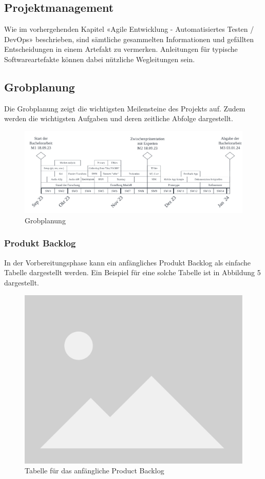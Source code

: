 \documentclass[main.tex]{subfiles} %
\begin{document}
\subsection{Projektmanagement}

Wie im vorhergehenden Kapitel «Agile Entwicklung - Automatisiertes Testen / DevOps»
beschrieben, sind sämtliche gesammelten Informationen und gefällten Entscheidungen
in einem Artefakt zu vermerken. Anleitungen für typische Softwareartefakte können
dabei nützliche Wegleitungen sein.

\subsection{Grobplanung}
Die Grobplanung zeigt die wichtigsten Meilensteine des Projekts auf. Zudem werden
die wichtigsten Aufgaben und deren zeitliche Abfolge dargestellt.

\begin{figure}[h]
    \hspace{-0.075\linewidth} %
    \includegraphics[width=1.15\linewidth]{img/projectplan.png}
    \caption{Grobplanung}
    \label{fig:grobplanung}
\end{figure}




\subsubsection{Produkt Backlog}

In der Vorbereitungsphase kann ein anfängliches Produkt Backlog als einfache Tabelle
dargestellt werden. Ein Beispiel für eine solche Tabelle ist in Abbildung 5 dargestellt.



\begin{figure}[h]
    \centering
    \includegraphics[width=0.7\linewidth]{img/placeholder.png}
    \caption{Tabelle für das anfängliche Product Backlog}
    \label{fig:backlog_table}
\end{figure}
\end{document}
